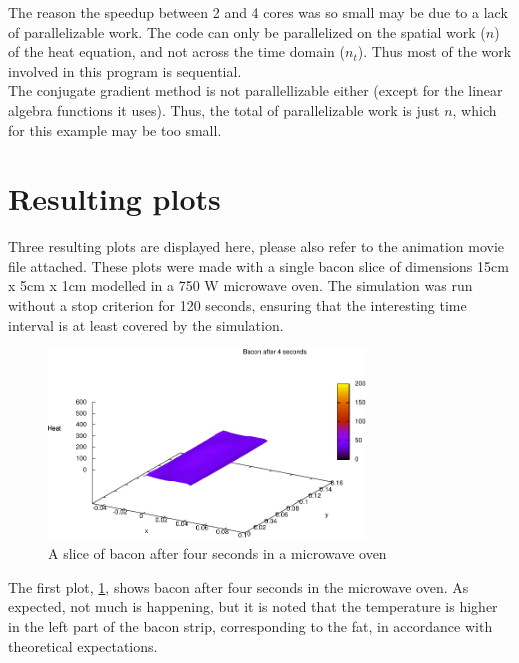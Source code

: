 The reason the speedup between 2 and 4 cores was so small may be due to a lack of
parallelizable work. The code can only be parallelized on the spatial work ($n$) of the
heat equation, and not across the time domain ($n_t$). Thus most of the work involved in
this program is sequential. \\

The conjugate gradient method is not parallellizable either (except for the linear algebra functions it
uses). Thus, the total of parallelizable work is just $n$, which for this example may be too small.

\section{Resulting plots}
Three resulting plots are displayed here, please also refer to the animation
movie file attached. These plots were made with a single bacon slice of
dimensions 15cm x 5cm x 1cm modelled in a 750 W microwave oven. The
simulation was run without a stop criterion for 120 seconds, ensuring that the
interesting time interval is at least covered by the simulation. \\

\begin{figure}[!h]
  \begin{center}
    \includegraphics[width=0.75\textwidth]{bacon-4sec.pdf}
  \end{center}
  \caption{A slice of bacon after four seconds in a microwave oven}
  \label{fig:bacon-4sec}
\end{figure}

The first plot, \cref{fig:bacon-4sec}, shows bacon after four seconds in the microwave oven. As
expected, not much is happening, but it is noted that the temperature is higher
in the left part of the bacon strip, corresponding to the fat, in accordance
with theoretical expectations.\\

